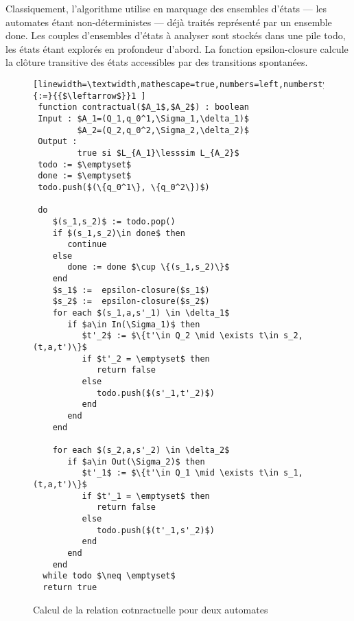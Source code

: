Classiquement, l'algorithme utilise en \og marquage\fg{} des ensembles
d'\'etats --- les automates \'etant non-d\'eterministes ---
d\'ej\`a trait\'es repr\'esent\'e par un ensemble \textsf{done}. Les couples d'ensembles d'\'etats \`a
analyser sont stock\'es dans une pile \textsf{todo}, les \'etats
\'etant explor\'es en profondeur d'abord. La fonction
\textsf{epsilon-closure} calcule la cl\^oture transitive des 
    \'etats accessibles par des transitions spontan\'ees.

\begin{figure}[htbp]
    \centering
    \begin{lstlisting}[linewidth=\textwidth,mathescape=true,numbers=left,numberstyle=\tiny,literate={:=}{{$\leftarrow$}}1 ]
 function contractual($A_1$,$A_2$) : boolean
 Input : $A_1=(Q_1,q_0^1,\Sigma_1,\delta_1)$
         $A_2=(Q_2,q_0^2,\Sigma_2,\delta_2)$
 Output : 
         true si $L_{A_1}\lesssim L_{A_2}$
 todo := $\emptyset$
 done := $\emptyset$
 todo.push($(\{q_0^1\}, \{q_0^2\})$)
 
 do 
    $(s_1,s_2)$ := todo.pop()
    if $(s_1,s_2)\in done$ then
       continue
    else
       done := done $\cup \{(s_1,s_2)\}$
    end
    $s_1$ :=  epsilon-closure($s_1$)
    $s_2$ :=  epsilon-closure($s_2$)
    for each $(s_1,a,s'_1) \in \delta_1$ 
       if $a\in In(\Sigma_1)$ then 
          $t'_2$ := $\{t'\in Q_2 \mid \exists t\in s_2,(t,a,t')\}$
          if $t'_2 = \emptyset$ then
             return false
          else
             todo.push($(s'_1,t'_2)$)
          end
       end
    end

    for each $(s_2,a,s'_2) \in \delta_2$ 
       if $a\in Out(\Sigma_2)$ then 
          $t'_1$ := $\{t'\in Q_1 \mid \exists t\in s_1,(t,a,t')\}$
          if $t'_1 = \emptyset$ then
             return false
          else
             todo.push($(t'_1,s'_2)$)
          end
       end
    end
  while todo $\neq \emptyset$
  return true
 \end{lstlisting}
 \caption{Calcul de la relation cotnractuelle pour deux automates} 
 \label{fig-algo-contrat}
 \end{figure} 



